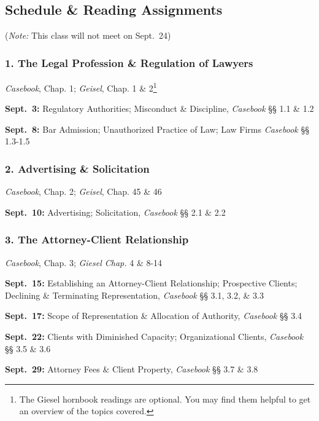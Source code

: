 \documentclass[11pt,letterpaper,twoside]{article}
\begin{document}
\subsection{Schedule \& Reading
Assignments}\label{schedule-reading-assignments}

(\emph{Note:} This class will not meet on Sept.~24)

\subsubsection{1. The Legal Profession \& Regulation of
Lawyers}\label{the-legal-profession-regulation-of-lawyers}

\emph{Casebook}, Chap. 1; \emph{Geisel}, Chap. 1 \& 2\footnote{The
  Giesel hornbook readings are optional. You may find them helpful to
  get an overview of the topics covered.}

\textbf{Sept.~3:} Regulatory Authorities; Misconduct \& Discipline,
\emph{Casebook} §§ 1.1 \& 1.2

\textbf{Sept.~8:} Bar Admission; Unauthorized Practice of Law; Law Firms
\emph{Casebook} §§ 1.3-1.5

\subsubsection{2. Advertising \&
Solicitation}\label{advertising-solicitation}

\emph{Casebook}, Chap. 2; \emph{Geisel}, Chap. 45 \& 46

\textbf{Sept.~10:} Advertising; Solicitation, \emph{Casebook} §§ 2.1 \&
2.2

\subsubsection{3. The Attorney-Client
Relationship}\label{the-attorney-client-relationship}

\emph{Casebook}, Chap. 3; \emph{Giesel Chap.} 4 \& 8-14

\textbf{Sept.~15:} Establishing an Attorney-Client Relationship;
Prospective Clients; Declining \& Terminating Representation,
\emph{Casebook} §§ 3.1, 3.2, \& 3.3

\textbf{Sept.~17:} Scope of Representation \& Allocation of Authority,
\emph{Casebook} §§ 3.4

\textbf{Sept.~22:} Clients with Diminished Capacity; Organizational
Clients, \emph{Casebook} §§ 3.5 \& 3.6

\textbf{Sept.~29:} Attorney Fees \& Client Property, \emph{Casebook} §§
3.7 \& 3.8
\end{document}
